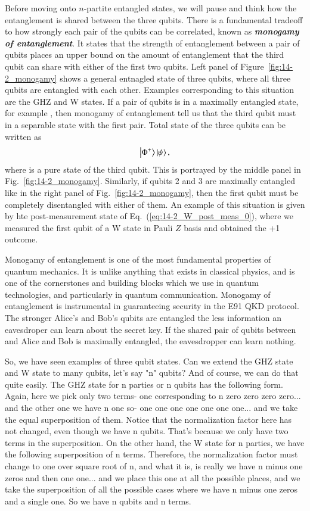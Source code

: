 Before moving onto $n$-partite entangled states, we will pause and think how the entanglement is shared between the three qubits.
There is a fundamental tradeoff to how strongly each pair of the qubits can be correlated, known as \textit{\textbf{monogamy of entanglement}}.
It states that the strength of entanglement between a pair of qubits places an upper bound on the amount of entanglement that the third qubit can share with either of the first two qubits.
Left panel of Figure~\ref{fig:14-2_monogamy} shows a general entnagled state of three qubits, where all three qubits are entangled with each other.
Examples corresponding to this situation are the GHZ and W states.
If a pair of qubits is in a maximally entangled state, for example \ket{\Phi+}, then monogamy of entanglement tell us that the third qubit must in a separable state with the first pair.
Total state of the three qubits can be written as
\begin{equation}
    \left| \Phi^+ \right\rangle\left| \psi \right\rangle,
\end{equation}
where \ket{\psi} is a pure state of the third qubit.
This is portrayed by the middle panel in Fig.~\ref{fig:14-2_monogamy}.
Similarly, if qubits 2 and 3 are maximally entangled like in the right panel of Fig.~\ref{fig:14-2_monogamy}, then the first qubit must be completely disentangled with either of them.
An example of this situation is given by hte post-measurement state of Eq.~(\ref{eq:14-2_W_post_meas_0}), where we measured the first qubit of a W state in Pauli $Z$ basis and obtained the +1 outcome.

Monogamy of entanglement is one of the most fundamental properties of quantum mechanics. It is unlike anything that exists in classical physics, and is one of the cornerstones and building blocks which we use in quantum technologies, and particularly in quantum communication.
Monogamy of entanglement is instrumental in guaranteeing security in the E91 QKD protocol.
The stronger Alice's and Bob's qubits are entangled the less information an eavesdroper can learn about the secret key.
If the shared pair of qubits between and Alice and Bob is maximally entangled, the eavesdropper can learn nothing.


So, we have seen examples of three qubit states. Can we extend the GHZ state and W state to many qubits, let's say "n" qubits? And of course, we can do that quite easily. The GHZ state for n parties or n qubits has the following form. Again, here we pick only two terms- one corresponding to n zero zero zero zero... and the other one we have n one so- one one one one one one one... and we take the equal superposition of them. Notice that the normalization factor here has not changed, even though we have n qubits. That's because we only have two terms in the superposition. On the other hand, the W state for n parties, we have the following superposition of n terms. Therefore, the normalization factor must change to one over square root of n, and what it is, is really we have n minus one zeros and then one one... and we place this one at all the possible places, and we take the superposition of all the possible cases where we have n minus one zeros and a single one. So we have n qubits and n terms.

